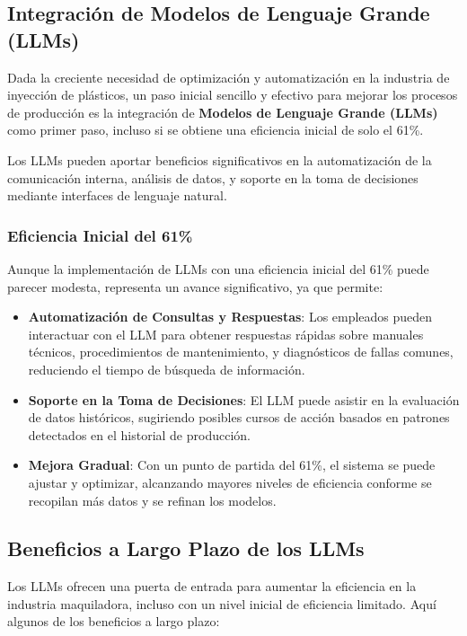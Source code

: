 \newpage

\subsection{Integración de Modelos de Lenguaje Grande (LLMs)}

Dada la creciente necesidad de optimización y automatización en la industria de inyección de plásticos, un paso inicial sencillo y efectivo para mejorar los procesos de producción es la integración de \textbf{Modelos de Lenguaje Grande (LLMs)} como primer paso, incluso si se obtiene una eficiencia inicial de solo el 61\%. 

Los LLMs pueden aportar beneficios significativos en la automatización de la comunicación interna, análisis de datos, y soporte en la toma de decisiones mediante interfaces de lenguaje natural.

\subsubsection{Eficiencia Inicial del 61\%}

Aunque la implementación de LLMs con una eficiencia inicial del 61\% puede parecer modesta, representa un avance significativo, ya que permite:

\begin{itemize}
    \item \textbf{Automatización de Consultas y Respuestas}: Los empleados pueden interactuar con el LLM para obtener respuestas rápidas sobre manuales técnicos, procedimientos de mantenimiento, y diagnósticos de fallas comunes, reduciendo el tiempo de búsqueda de información.
    \item \textbf{Soporte en la Toma de Decisiones}: El LLM puede asistir en la evaluación de datos históricos, sugiriendo posibles cursos de acción basados en patrones detectados en el historial de producción.
    \item \textbf{Mejora Gradual}: Con un punto de partida del 61\%, el sistema se puede ajustar y optimizar, alcanzando mayores niveles de eficiencia conforme se recopilan más datos y se refinan los modelos.
\end{itemize}

\subsection{Beneficios a Largo Plazo de los LLMs}

Los LLMs ofrecen una puerta de entrada para aumentar la eficiencia en la industria maquiladora, incluso con un nivel inicial de eficiencia limitado. Aquí algunos de los beneficios a largo plazo:

